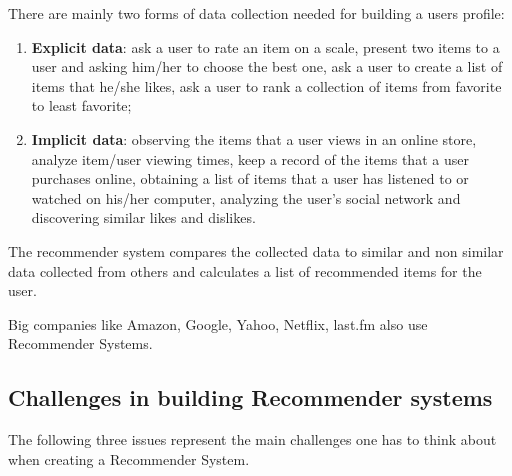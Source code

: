 \documentclass[11pt]{amsart}
\begin{document}
There are mainly two forms of data collection needed for building a users profile:
\begin{enumerate}
  \item \textbf{Explicit data}: ask a user to rate an item on a scale, present two items to a user and asking him/her to choose the best one, ask a user to create a list of items that he/she likes, ask a user to rank a collection of items from favorite to least favorite;
  \item \textbf{Implicit data}: observing the items that a user views in an online store, analyze item/user viewing times, keep a record of the items that a user purchases online, obtaining a list of items that a user has listened to or watched on his/her computer, analyzing the user's social network and discovering similar likes and dislikes.
\end{enumerate}

The recommender system compares the collected data to similar and non similar data collected from others and calculates a list of recommended items for the user.

Big companies like Amazon, Google, Yahoo, Netflix, last.fm also use Recommender Systems.

\subsection{Challenges in building Recommender systems}
 The following three issues represent the main challenges one has to think about when creating a Recommender System.
 
\end{document}
